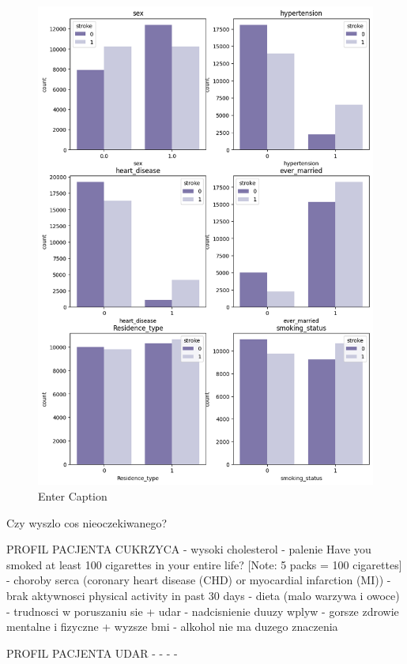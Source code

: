 \documentclass[onecolumn,12pt]{article}
\begin{document}
\begin{figure}
    \centering
    \includegraphics[width=1\linewidth]{raport/graphs/stroke_binary.png}
    \caption{Enter Caption}
    \label{fig:enter-label}
\end{figure}

\newpage
Czy wyszlo cos nieoczekiwanego?

PROFIL PACJENTA CUKRZYCA
- wysoki cholesterol
- palenie Have you smoked at least 100 cigarettes in your entire life? [Note: 5 packs = 100 cigarettes]
- choroby serca (coronary heart disease (CHD) or myocardial infarction (MI))
- brak aktywnosci physical activity in past 30 days
- dieta (malo warzywa i owoce)
- trudnosci w poruszaniu sie + udar
- nadcisnienie duuzy wplyw
- gorsze zdrowie mentalne i fizyczne + wyzsze bmi
- alkohol nie ma duzego znaczenia

PROFIL PACJENTA UDAR
- 
- 
- 
- 
\end{document}
